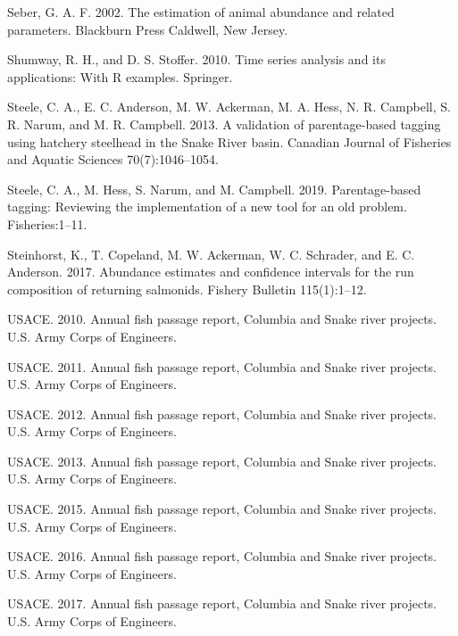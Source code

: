 \documentclass[
  12pt,
]{article}
\begin{document}
\leavevmode\hypertarget{ref-Seber2002}{}%
Seber, G. A. F. 2002. The estimation of animal abundance and related parameters. Blackburn Press Caldwell, New Jersey.

\leavevmode\hypertarget{ref-Shumway2010}{}%
Shumway, R. H., and D. S. Stoffer. 2010. Time series analysis and its applications: With R examples. Springer.

\leavevmode\hypertarget{ref-Steele2013}{}%
Steele, C. A., E. C. Anderson, M. W. Ackerman, M. A. Hess, N. R. Campbell, S. R. Narum, and M. R. Campbell. 2013. A validation of parentage-based tagging using hatchery steelhead in the Snake River basin. Canadian Journal of Fisheries and Aquatic Sciences 70(7):1046--1054.

\leavevmode\hypertarget{ref-Steele2019}{}%
Steele, C. A., M. Hess, S. Narum, and M. Campbell. 2019. Parentage-based tagging: Reviewing the implementation of a new tool for an old problem. Fisheries:1--11.

\leavevmode\hypertarget{ref-Steinhorst2017}{}%
Steinhorst, K., T. Copeland, M. W. Ackerman, W. C. Schrader, and E. C. Anderson. 2017. Abundance estimates and confidence intervals for the run composition of returning salmonids. Fishery Bulletin 115(1):1--12.

\leavevmode\hypertarget{ref-USACE2010}{}%
USACE. 2010. Annual fish passage report, Columbia and Snake river projects. U.S. Army Corps of Engineers.

\leavevmode\hypertarget{ref-USACE2011}{}%
USACE. 2011. Annual fish passage report, Columbia and Snake river projects. U.S. Army Corps of Engineers.

\leavevmode\hypertarget{ref-USACE2012}{}%
USACE. 2012. Annual fish passage report, Columbia and Snake river projects. U.S. Army Corps of Engineers.

\leavevmode\hypertarget{ref-USACE2013}{}%
USACE. 2013. Annual fish passage report, Columbia and Snake river projects. U.S. Army Corps of Engineers.

\leavevmode\hypertarget{ref-USACE2015}{}%
USACE. 2015. Annual fish passage report, Columbia and Snake river projects. U.S. Army Corps of Engineers.

\leavevmode\hypertarget{ref-USACE2016}{}%
USACE. 2016. Annual fish passage report, Columbia and Snake river projects. U.S. Army Corps of Engineers.

\leavevmode\hypertarget{ref-USACE2017}{}%
USACE. 2017. Annual fish passage report, Columbia and Snake river projects. U.S. Army Corps of Engineers.
\end{document}
